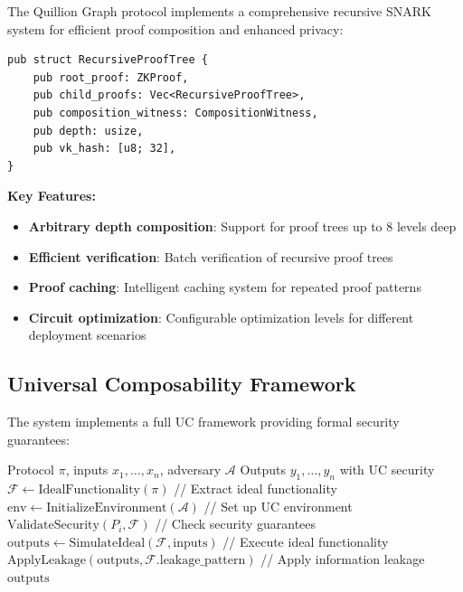\documentclass[12pt,a4paper]{article}
\begin{document}
The Quillion Graph protocol implements a comprehensive recursive SNARK system for efficient proof composition and enhanced privacy:

\begin{lstlisting}[style=rustcode, caption=Recursive Proof Tree Structure]
pub struct RecursiveProofTree {
    pub root_proof: ZKProof,
    pub child_proofs: Vec<RecursiveProofTree>,
    pub composition_witness: CompositionWitness,
    pub depth: usize,
    pub vk_hash: [u8; 32],
}
\end{lstlisting}

\textbf{Key Features:}
\begin{itemize}
\item \textbf{Arbitrary depth composition}: Support for proof trees up to 8 levels deep
\item \textbf{Efficient verification}: Batch verification of recursive proof trees
\item \textbf{Proof caching}: Intelligent caching system for repeated proof patterns
\item \textbf{Circuit optimization}: Configurable optimization levels for different deployment scenarios
\end{itemize}

\subsection{Universal Composability Framework}

The system implements a full UC framework providing formal security guarantees:

\begin{algorithm}
\caption{UC Protocol Execution}
\begin{algorithmic}[1]
\REQUIRE Protocol $\pi$, inputs $x_1, \ldots, x_n$, adversary $\mathcal{A}$
\ENSURE Outputs $y_1, \ldots, y_n$ with UC security
\STATE $\mathcal{F} \leftarrow \text{IdealFunctionality}(\pi)$ // Extract ideal functionality
\STATE $\text{env} \leftarrow \text{InitializeEnvironment}(\mathcal{A})$ // Set up UC environment
    \STATE $\text{ValidateSecurity}(P_i, \mathcal{F})$ // Check security guarantees
\ENDFOR
\STATE $\text{outputs} \leftarrow \text{SimulateIdeal}(\mathcal{F}, \text{inputs})$ // Execute ideal functionality
\STATE $\text{ApplyLeakage}(\text{outputs}, \mathcal{F}.\text{leakage\_pattern})$ // Apply information leakage
\RETURN $\text{outputs}$
\end{algorithmic}
\end{algorithm}
\end{document}
